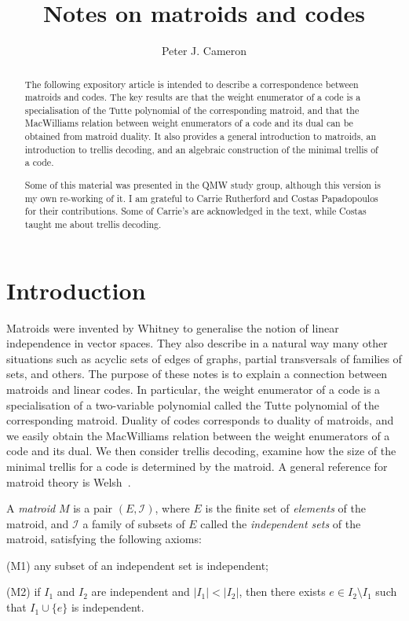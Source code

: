 \documentclass[12pt]{article}
\begin{document}
\title{Notes on matroids and codes}

\author{Peter J. Cameron}

\date{}

\maketitle

\begin{abstract}
The following expository article is intended to describe a correspondence
between matroids and codes. The key results are that the weight
enumerator of a code is a specialisation of the Tutte polynomial
of the corresponding matroid, and that the MacWilliams relation between
weight enumerators of a code and its dual can be obtained from matroid
duality. It also provides a general introduction to matroids, an
introduction to trellis decoding, and an algebraic construction of
the minimal trellis of a code.

Some of this material was presented in the QMW study group, although this
version is my own re-working of it. I am grateful to Carrie Rutherford
and Costas Papadopoulos for their contributions. Some of Carrie's are
acknowledged in the text, while Costas taught me about trellis decoding.
\end{abstract}

\section{Introduction}

Matroids were invented by Whitney to generalise the notion of
linear independence in vector spaces. They also describe in a
natural way many other situations such as acyclic sets of edges
of graphs, partial transversals of families of sets, and others.
The purpose of these notes is to explain a connection between
matroids and linear codes. In particular, the weight enumerator of
a code is a specialisation of a two-variable polynomial called the
Tutte polynomial of the corresponding matroid. Duality of codes
corresponds to duality of matroids, and we easily obtain the
MacWilliams relation between the weight enumerators of a code
and its dual. We then consider trellis decoding, examine how the
size of the minimal trellis for a code is determined by the matroid.
A general reference for matroid theory is Welsh~\cite{welsh}.

A \emph{matroid} $M$ is a pair $(E,\mathcal{I})$, where $E$ is the
finite set of \emph{elements} of the matroid, and $\mathcal{I}$ a
family of subsets of $E$ called the \emph{independent sets} of
the matroid, satisfying the following axioms:
\begin{description}
\item{(M1)} any subset of an independent set is independent;
\item{(M2)} if $I_1$ and $I_2$ are independent and $|I_1|<|I_2|$,
then there exists $e\in I_2\setminus I_1$ such that $I_1\cup\{e\}$
is independent.
\end{description}
\end{document}
